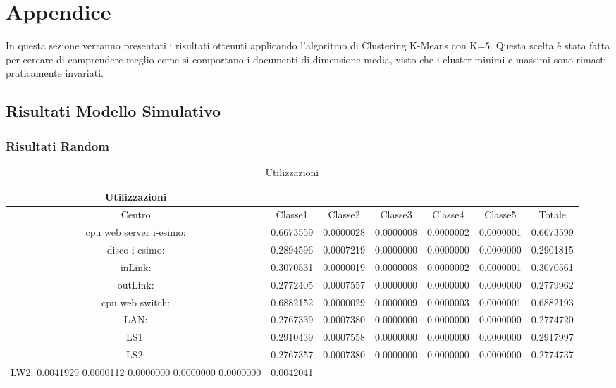 \chapter{Appendice}\label{appendice}
In questa sezione verranno presentati i risultati ottenuti applicando l'algoritmo di Clustering K-Means con K=5. Questa scelta è stata fatta per cercare di comprendere meglio come si comportano i documenti di dimensione media, visto che i cluster minimi e massimi sono rimasti praticamente invariati. 
\section{Risultati Modello Simulativo}
\subsection{Risultati Random}
\begin{table}[H]
\begin{center}
\begin{tabular}{||c|c|c|c|c|c|c||}
\hline
Utilizzazioni\\
\hline
Centro &Classe1 &Classe2 &Classe3 &Classe4 &Classe5 &Totale\\
\hline
\hline
 cpu web server i-esimo: 	&0.6673559	&0.0000028	&0.0000008	&0.0000002	&0.0000001	&0.6673599\\
\hline
 disco i-esimo: 	&0.2894596	&0.0007219	&0.0000000	&0.0000000	&0.0000000	&0.2901815\\
\hline
 inLink: 	&0.3070531	&0.0000019	&0.0000008	&0.0000002	&0.0000001	&0.3070561\\
\hline
 outLink: 	&0.2772405	&0.0007557	&0.0000000	&0.0000000	&0.0000000	&0.2779962\\
\hline
 cpu web switch: 	&0.6882152	&0.0000029	&0.0000009	&0.0000003	&0.0000001	&0.6882193\\
\hline
 LAN: 	&0.2767339	&0.0007380	&0.0000000	&0.0000000	&0.0000000	&0.2774720\\
\hline
 LS1: 	&0.2910439	&0.0007558	&0.0000000	&0.0000000	&0.0000000	&0.2917997\\
\hline
 LS2:	&0.2767357	&0.0007380	&0.0000000	&0.0000000	&0.0000000	&0.2774737\\
\hline
 LW2: 	0.0041929	0.0000112	0.0000000	0.0000000	0.0000000	&0.0042041\\
\hline
\end{tabular}
\end{center}
\caption{Utilizzazioni}
\label{risrandom}
\end{table}

